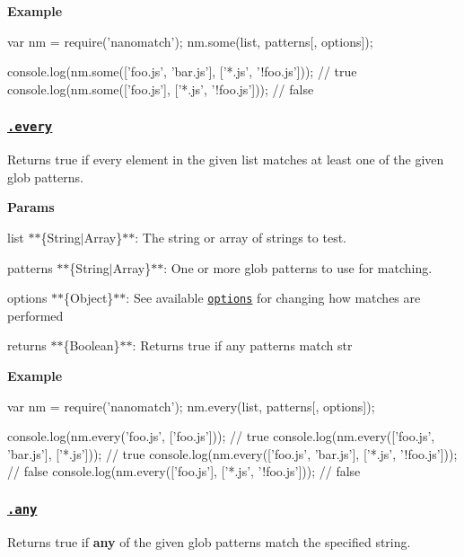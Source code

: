 {\bfseries Example}


\begin{DoxyCode}
var nm = require('nanomatch');
nm.some(list, patterns[, options]);

console.log(nm.some(['foo.js', 'bar.js'], ['*.js', '!foo.js']));
// true
console.log(nm.some(['foo.js'], ['*.js', '!foo.js']));
// false
\end{DoxyCode}


\subsubsection*{\href{index.js#L243}{\tt .every}}

Returns true if every element in the given {\ttfamily list} matches at least one of the given glob {\ttfamily patterns}.

{\bfseries Params}


\begin{DoxyItemize}
\item {\ttfamily list} $\ast$$\ast$\{String$\vert$\+Array\}$\ast$$\ast$\+: The string or array of strings to test.
\item {\ttfamily patterns} $\ast$$\ast$\{String$\vert$\+Array\}$\ast$$\ast$\+: One or more glob patterns to use for matching.
\item {\ttfamily options} $\ast$$\ast$\{Object\}$\ast$$\ast$\+: See available \href{#options}{\tt options} for changing how matches are performed
\item {\ttfamily returns} $\ast$$\ast$\{Boolean\}$\ast$$\ast$\+: Returns true if any patterns match {\ttfamily str}
\end{DoxyItemize}

{\bfseries Example}


\begin{DoxyCode}
var nm = require('nanomatch');
nm.every(list, patterns[, options]);

console.log(nm.every('foo.js', ['foo.js']));
// true
console.log(nm.every(['foo.js', 'bar.js'], ['*.js']));
// true
console.log(nm.every(['foo.js', 'bar.js'], ['*.js', '!foo.js']));
// false
console.log(nm.every(['foo.js'], ['*.js', '!foo.js']));
// false
\end{DoxyCode}


\subsubsection*{\href{index.js#L277}{\tt .any}}

Returns true if {\bfseries any} of the given glob {\ttfamily patterns} match the specified {\ttfamily string}.

